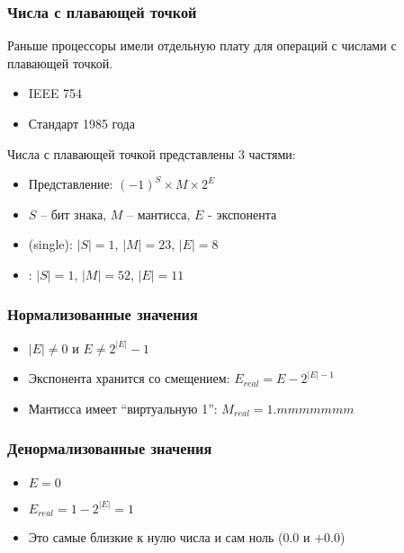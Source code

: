   \subsubsection{Числа с плавающей точкой}
  Раньше процессоры имели отдельную плату для операций с числами с плавающей точкой.
    \begin{itemize}
      \item IEEE 754
      \item Стандарт 1985 года
    \end{itemize}
  
    Числа с плавающей точкой представлены 3 частями:
    \begin{itemize}
      \item Представление: $(-1)^S \times M \times 2^E$
      \item $S$ -- бит знака, $M$ -- мантисса, $E$ - экспонента
      \item {} (single): $|S| = 1$, $|M| = 23$, $|E| = 8$
      \item {}: $|S| = 1$, $|M| = 52$, $|E| = 11$
    \end{itemize}
  
  \subsubsection*{Нормализованные значения}
    \begin{itemize}
      \item $|E| \neq 0$ и $E \neq 2^{|E|} - 1$
      \item Экспонента хранится со смещением: $E_{real} = E - 2^{|E| - 1}$
      \item Мантисса имеет ``виртуальную 1'': $M_{real} = 1.mmmmmmm$
    \end{itemize}
    
  \subsubsection*{Денормализованные значения}
    \begin{itemize}
      \item $E = 0$
      \item $E_{real} = 1 - 2^{|E|} = 1$
      \item Это самые близкие к нулю числа и сам ноль ($0.0$ и $+0.0$)
    \end{itemize}
  
